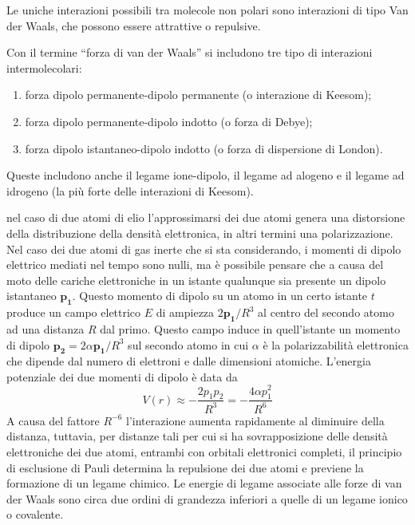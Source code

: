 Le uniche interazioni possibili tra molecole non polari sono interazioni di tipo Van der Waals, che possono essere attrattive o repulsive.
\begin{defn}
    Con il termine ``forza di van der Waals'' si includono tre tipo di interazioni intermolecolari:
    \begin{enumerate}
        \item forza dipolo permanente-dipolo permanente (o interazione di Keesom);
        \item forza dipolo permanente-dipolo indotto (o forza di Debye);
        \item forza dipolo istantaneo-dipolo indotto (o forza di dispersione di London).
    \end{enumerate}
    Queste includono anche il legame ione-dipolo, il legame ad alogeno e il legame ad idrogeno (la più forte delle interazioni di Keesom).
\end{defn}
nel caso di due atomi di elio l'approssimarsi dei due atomi genera una distorsione della distribuzione della densità elettronica, in altri termini una polarizzazione. Nel caso dei due atomi di gas inerte che si sta considerando, i momenti di dipolo elettrico mediati nel tempo sono nulli, ma è possibile pensare che a causa del moto delle cariche elettroniche in un istante qualunque sia presente un dipolo istantaneo $\bm{p_1}$. Questo momento di dipolo su un atomo in un certo istante $t$ produce un campo elettrico $E$ di ampiezza $2\bm{p_1}/R^3$ al centro del secondo atomo ad una distanza $R$ dal primo. Questo campo induce in quell'istante un momento di dipolo $\bm{p_2}=2\alpha\bm{p_1}/R^3$ sul secondo atomo in cui $\alpha$ è la polarizzabilità elettronica che dipende dal numero di elettroni e dalle dimensioni atomiche. L'energia potenziale dei due momenti di dipolo è data da
\begin{equation}
    V(r)\approx-\frac{2p_1p_2}{R^3}=-\frac{4\alpha p_1^2}{R^6}
\end{equation}
A causa del fattore $R^{-6}$ l'interazione aumenta rapidamente al diminuire della distanza, tuttavia, per distanze tali per cui si ha sovrapposizione delle densità elettroniche dei due atomi, entrambi con orbitali elettronici completi, il principio di esclusione di Pauli determina la repulsione dei due atomi e previene la formazione di un legame chimico. Le energie di legame associate alle forze di van der Waals sono circa due ordini di grandezza inferiori a quelle di un legame ionico o covalente. 

